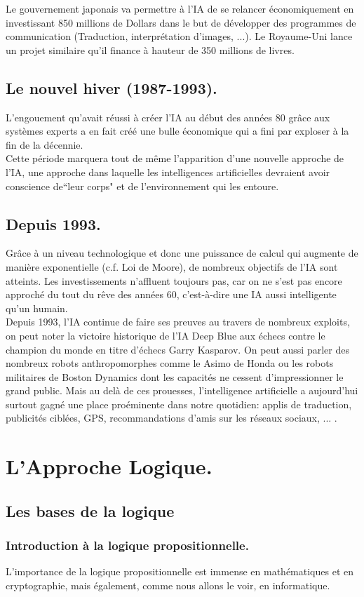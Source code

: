 \documentclass[a4paper, 12pt]{article}
\numberwithin{equation}{subsection}
\begin{document}
Le gouvernement japonais va permettre à l'IA de se relancer économiquement en investissant 850 millions de Dollars dans le but de développer des programmes de communication (Traduction, interprétation d'images, ...). Le Royaume-Uni lance un projet similaire qu'il finance à hauteur de 350 millions de livres.
\subsection{Le nouvel hiver (1987-1993).}
L'engouement qu'avait réussi à créer l'IA au début des années 80 grâce aux systèmes experts a en fait créé une bulle économique qui a fini par exploser à la fin de la décennie.\\
Cette période marquera tout de même l'apparition d'une nouvelle approche de l'IA, une approche dans laquelle les intelligences artificielles devraient avoir conscience de``leur corps" et de l'environnement qui les entoure.
\subsection{Depuis 1993.}
Grâce à un niveau technologique et donc une puissance de calcul qui augmente de manière exponentielle (c.f. Loi de Moore), de nombreux objectifs de l'IA sont atteints. Les investissements n'affluent toujours pas, car on ne s'est pas encore approché du tout du rêve des années 60, c'est-à-dire une IA aussi intelligente qu'un humain.\\

Depuis 1993, l'IA continue de faire ses preuves au travers de nombreux exploits, on peut noter la victoire historique de l'IA Deep Blue aux échecs contre le champion du monde en titre d'échecs Garry Kasparov. On peut aussi parler des nombreux robots anthropomorphes comme le Asimo de Honda ou les robots militaires de Boston Dynamics dont les capacités ne cessent d'impressionner le grand public. Mais au delà de ces prouesses, l'intelligence artificielle a aujourd'hui surtout gagné une place proéminente dans notre quotidien: applis de traduction, publicités ciblées, GPS, recommandations d'amis sur les réseaux sociaux, ... .
\newpage
\section{L'Approche Logique.}
\subsection{Les bases de la logique}
  \subsubsection{Introduction à la logique propositionnelle.}
  L'importance de la logique propositionnelle est immense en mathématiques et en cryptographie, mais également, comme nous allons le voir, en informatique.\\
\end{document}
